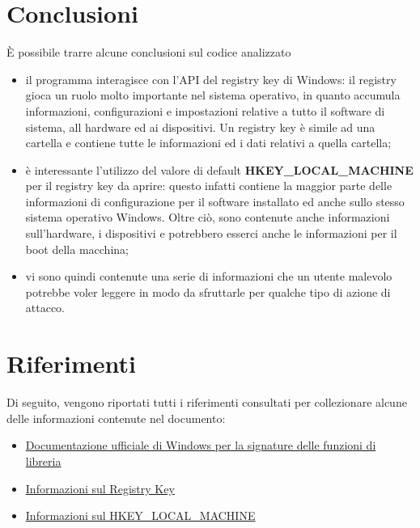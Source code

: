 \documentclass[12pt]{extarticle}
\begin{document}
\section{Conclusioni}
È possibile trarre alcune conclusioni sul codice analizzato
\begin{itemize}
\item il programma interagisce con l'API del registry key di Windows: il registry gioca un ruolo molto importante nel sistema operativo, in quanto accumula informazioni, configurazioni e impostazioni relative a tutto il software di sistema, all hardware ed ai dispositivi. Un registry key è simile ad una cartella e contiene tutte le informazioni ed i dati relativi a quella cartella;
\item è interessante l'utilizzo del valore di default \textbf{HKEY\_LOCAL\_MACHINE} per il registry key da aprire: questo infatti contiene la maggior parte delle informazioni di configurazione per il software installato ed anche sullo stesso sistema operativo Windows. Oltre ciò, sono contenute anche informazioni sull'hardware, i dispositivi e potrebbero esserci anche le informazioni per il boot della macchina;
\item vi sono quindi contenute una serie di informazioni che un utente malevolo potrebbe voler leggere in modo da sfruttarle per qualche tipo di azione di attacco.
\end{itemize}
\newpage
\section{Riferimenti}
Di seguito, vengono riportati tutti i riferimenti consultati per collezionare alcune delle informazioni contenute nel documento:
\begin{itemize}
\item \href{https://docs.microsoft.com}{Documentazione ufficiale di Windows per la signature delle funzioni di libreria}
\item \href{https://digitalmediaglobe.com/what-is-registry-key-registry-value/}{Informazioni sul Registry Key}
\item \href{https://www.lifewire.com/hkey-local-machine-2625902}{Informazioni sul HKEY\_LOCAL\_MACHINE}
\end{itemize}
\end{document}
